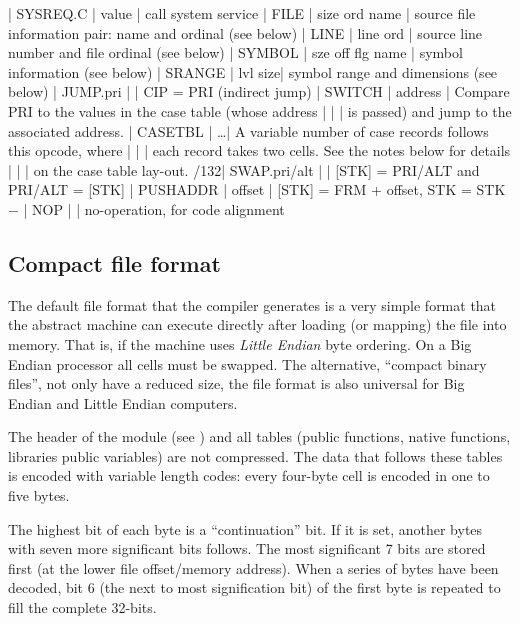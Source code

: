 {   | SYSREQ.C       | value   | call system service \nl
{}   | FILE           | size ord name | source file information pair: name and ordinal (see below) \nl
{}   | LINE           | line ord  | source line number and file ordinal (see below) \nl
{}   | SYMBOL         | sze off flg name | symbol information (see below) \nl
{}   | SRANGE         | lvl size| symbol range and dimensions (see below) \nl
{}   | JUMP.pri       |         | CIP = PRI (indirect jump) \nl
{}   | SWITCH         | address | Compare PRI to the values in the case table (whose address \nlnorule
\!       |                |         | is passed) and jump to the associated address. \nl
{}   | CASETBL        | \dots   | A variable number of case records follows this opcode, where \nlnorule
\!       |                |         | each record takes two cells. See the notes below for details \nlnorule
\!       |                |         | on the case table lay-out. \nl
{}/132| SWAP.pri/alt   |         | [STK] = PRI/ALT and PRI/ALT = [STK] \nl
{}    | PUSHADDR       | offset  | [STK] = FRM + offset, STK = STK $-$ \cellsize \nl
{}    | NOP            |         | no-operation, for code alignment \nl
}
\goodbreak

\subsection{Compact file format}
    
The default file format that the compiler generates is a very simple format that
the abstract machine can execute directly after loading (or mapping) the file
into memory. That is, if the machine uses {\it Little Endian\/} byte ordering.
On a Big Endian processor all cells must be swapped.
The alternative, ``compact binary files'', not only have a reduced size, the
file format is also universal for Big Endian and Little Endian computers.

The header of the module (see ) and all tables (public
functions, native functions, libraries public variables) are not compressed.
The data that follows these tables is encoded with variable length codes:
every four-byte cell is encoded in one to five bytes.

The highest bit of each byte is a ``continuation'' bit. If it is set, another
bytes with seven more significant bits follows. The most significant 7 bits
are stored first (at the lower file offset/memory address). When a series of
bytes have been decoded, bit 6 (the next to most signification bit) of the first
byte is repeated to fill the complete 32-bits.

